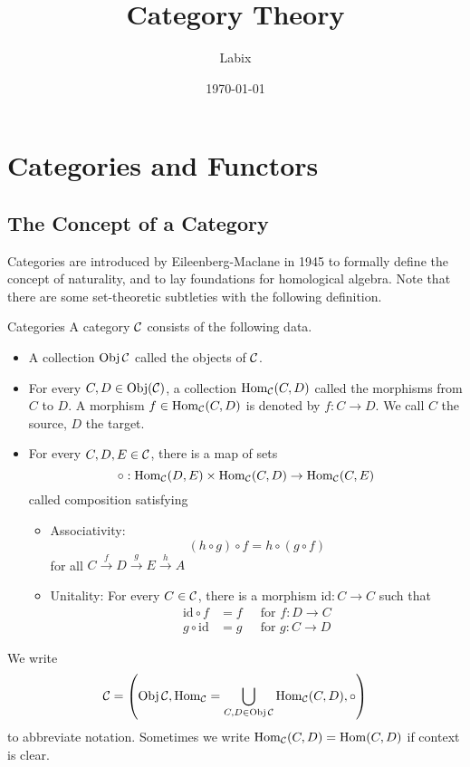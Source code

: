 \documentclass[a4paper]{article}
\title{Category Theory}
\author{Labix}
\date{\today}
\begin{document}
\maketitle
\begin{abstract}
\end{abstract}
\pagebreak
\tableofcontents
\pagebreak

\section{Categories and Functors}
\subsection{The Concept of a Category}
Categories are introduced by Eileenberg-Maclane in 1945 to formally define the concept of naturality, and to lay foundations for homological algebra. Note that there are some set-theoretic subtleties with the following definition. 

\begin{defn}{Categories}{} A category $\mathcal{C}$ consists of the following data. 
\begin{itemize}
\item A collection $\operatorname{Obj}\mathcal{C}$ called the objects of $\mathcal{C}$. 
\item For every $C,D\in\operatorname{Obj}(\mathcal{C})$, a collection $\operatorname{Hom}_{\mathcal{C}}(C,D)$ called the morphisms from $C$ to $D$. A morphism $f\in\operatorname{Hom}_{\mathcal{C}}(C,D)$ is denoted by $f:C\to D$. We call $C$ the source, $D$ the target. 
\item For every $C,D,E\in\mathcal{C}$, there is a map of sets $$\circ:\operatorname{Hom}_{\mathcal{C}}(D,E)\times\operatorname{Hom}_{\mathcal{C}}(C,D)\to\operatorname{Hom}_{\mathcal{C}}(C,E)$$ called composition satisfying
\begin{itemize}
\item Associativity: $$(h\circ g)\circ f=h\circ(g\circ f)$$ for all $C\overset{f}{\rightarrow}D\overset{g}{\rightarrow}E\overset{h}{\rightarrow}A$
\item Unitality: For every $C\in\mathcal{C}$, there is a morphism $\text{id}:C\to C$ such that 
\begin{align*}
\text{id}\circ f&=f\;\;\;\;\text{ for }f:D\to C\\
g\circ\text{id}&=g\;\;\;\;\text{ for }g:C\to D
\end{align*}
\end{itemize}
\end{itemize}
\end{defn}

We write $$\mathcal{C}=\left(\operatorname{Obj}\mathcal{C},\operatorname{Hom}_{\mathcal{C}}=\bigcup_{C,D\in\operatorname{Obj}\mathcal{C}}\operatorname{Hom}_{\mathcal{C}}(C,D),\circ\right)$$ to abbreviate notation. Sometimes we write $\operatorname{Hom}_{\mathcal{C}}(C,D)=\operatorname{Hom}(C,D)$ if context is clear. 
\end{document}
